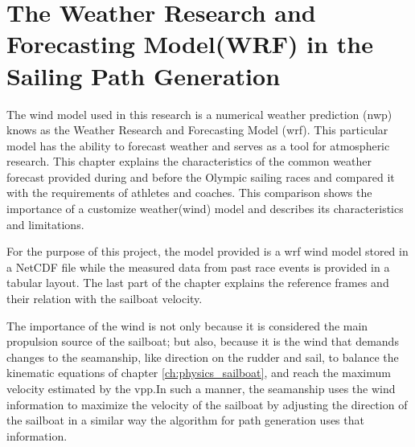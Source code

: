 
\chapter{The Weather Research and Forecasting Model(WRF) in the Sailing Path Generation} \label{ch:weatherModel} %

The wind model used in this research is a numerical weather prediction (\acrshort{nwp}) knows as the Weather Research and Forecasting Model (\acrshort{wrf}). This particular model has the ability to forecast weather and serves as a tool for atmospheric research.  
This chapter explains the characteristics of the common weather forecast provided during and before the Olympic sailing races and compared it with the requirements of athletes and coaches. This comparison shows the importance of a customize weather(wind) model and describes its characteristics and limitations. \par \noindent 
For the purpose of this project, the model provided is a \acrshort{wrf} wind model stored in a NetCDF file while the measured data from past race events is provided in a tabular layout. The last part of the chapter explains the reference frames and their relation with the sailboat velocity.\par

The importance of the wind is not only because it is considered the main propulsion source of the sailboat; but also, because it is the wind that demands changes to the seamanship, like direction on the rudder and sail, to balance the kinematic equations of chapter \ref{ch:physics_sailboat}, and reach the maximum velocity  estimated by the \acrshort{vpp}.In such a manner, the seamanship uses the wind information to maximize the velocity of the sailboat by adjusting the direction of the sailboat in a similar way the algorithm for path generation uses that information. \par 

